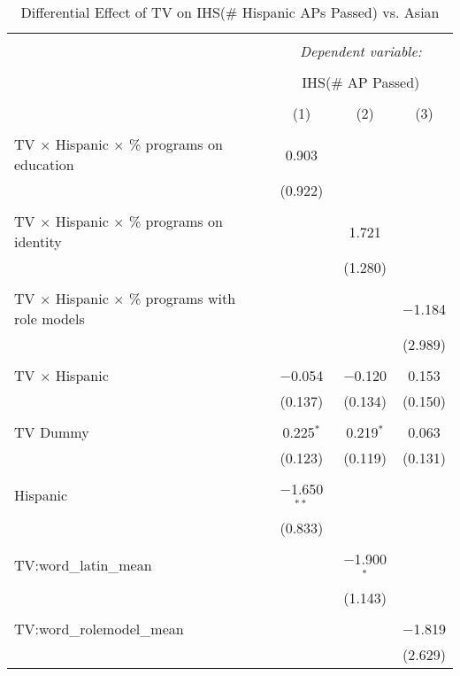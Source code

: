 
\begin{table}[!htbp] \centering 
  \caption{Differential Effect of TV on IHS(\# Hispanic APs Passed) vs. Asian} 
  \label{} 
\begin{tabular}{@{\extracolsep{-2pt}}lccc} 
\\[-1.8ex]\hline 
\hline \\[-1.8ex] 
 & \multicolumn{3}{c}{\textit{Dependent variable:}} \\ 
\cline{2-4} 
\\[-1.8ex] & \multicolumn{3}{c}{IHS(\# AP Passed)} \\ 
\\[-1.8ex] & (1) & (2) & (3)\\ 
\hline \\[-1.8ex] 
 TV $\times$ Hispanic $\times$ \% programs on education & 0.903 &  &  \\ 
  & (0.922) &  &  \\ 
  & & & \\ 
 TV $\times$ Hispanic $\times$ \% programs on identity &  & 1.721 &  \\ 
  &  & (1.280) &  \\ 
  & & & \\ 
 TV $\times$ Hispanic $\times$ \% programs with role models &  &  & $-$1.184 \\ 
  &  &  & (2.989) \\ 
  & & & \\ 
 TV $\times$ Hispanic & $-$0.054 & $-$0.120 & 0.153 \\ 
  & (0.137) & (0.134) & (0.150) \\ 
  & & & \\ 
 TV Dummy & 0.225$^{*}$ & 0.219$^{*}$ & 0.063 \\ 
  & (0.123) & (0.119) & (0.131) \\ 
  & & & \\ 
 Hispanic & $-$1.650$^{**}$ &  &  \\ 
  & (0.833) &  &  \\ 
  & & & \\ 
 TV:word\_latin\_mean &  & $-$1.900$^{*}$ &  \\ 
  &  & (1.143) &  \\ 
  & & & \\ 
 TV:word\_rolemodel\_mean &  &  & $-$1.819 \\ 
  &  &  & (2.629) \\ 

\end{tabular}
\end{table}
